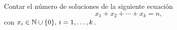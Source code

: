 \begin{statement}{21}
  Contar el n\'umero de soluciones de la siguiente ecuaci\'on
  \[
    x_1 + x_2 + \cdots + x_k = n,  
  \]
  con $x_i \in \mathbb{N} \cup \{0\},\, i = 1, \dots, k$.
\end{statement}